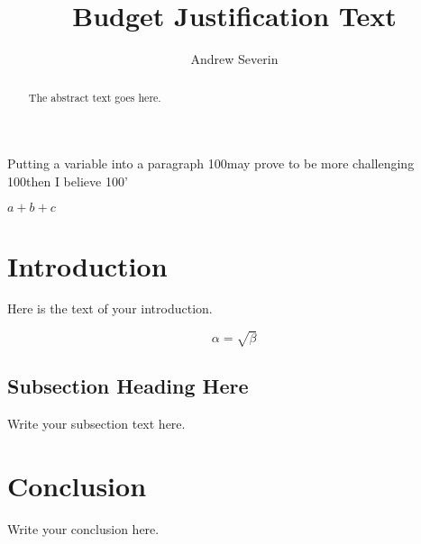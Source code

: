 \documentclass{article}
\newcommand{\testvariable}{100}
\begin{document}
\title{Budget Justification Text}
\author{Andrew Severin}

\maketitle

Putting a variable into a paragraph \testvariable may prove to be more challenging \testvariable then I believe \testvariable'

$a + b + c$

\begin{abstract}
The abstract text goes here.
\end{abstract}

\section{Introduction}
Here is the text of your introduction.

%

\begin{equation}
    \label{simple_equation}
    \alpha = \sqrt{ \beta }
\end{equation}

\subsection{Subsection Heading Here}
Write your subsection text here.


\section{Conclusion}
Write your conclusion here.
\end{document}

